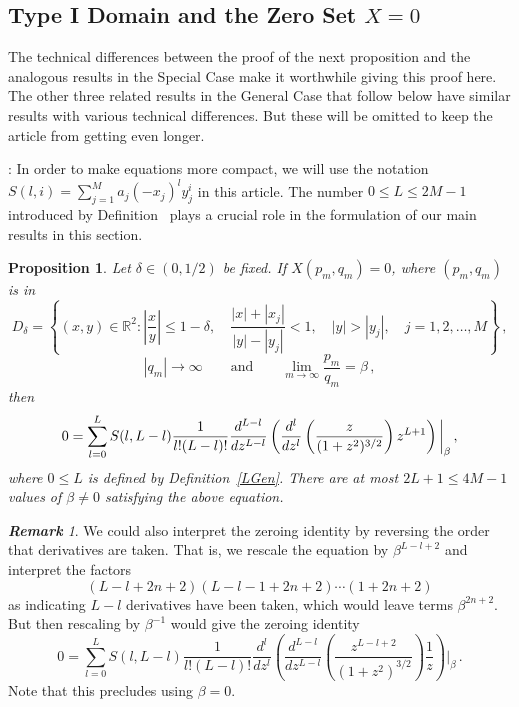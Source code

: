 \documentclass{article}
\newtheorem{prop}[thm]{Proposition}
\theoremstyle{remark}
\newtheorem{rem}[thm]{\bf Remark}
\numberwithin{equation}{section}
\begin{document}
\subsection{Type I Domain and the Zero Set $X=0$}\label{GenXI}

The technical differences between the proof of the next proposition and the analogous results in the Special Case make it worthwhile giving this proof here. 
The other three related results in the General Case that follow below have similar results with various technical differences.  But these will be omitted to 
keep the article from getting even longer.

\medskip

:  In order to make equations more compact, we will use the notation $S(l,i) = \sum_{j=1}^M a_j(-x_j)^ly_j^i$ in this article.
The number $0 \leq L \leq 2M-1$ introduced by Definition~ plays a crucial role in the formulation of our main results in this section. 

\begin{prop}\label{GenXTypeI} Let $\delta \in (0,1/2)$ be fixed. If $X(p_m,q_m) = 0$, where $(p_m,q_m)$ is in
$$ D_{\delta} = \left\{(x,y) \in \mathbb{R}^2: \left| \frac xy \right| \leq 1-\delta, \quad \frac{|x|+|x_j|}{|y|-|y_j|} < 1, \quad |y| > |y_j|, \quad j=1,2,\ldots,M \right\}\,,$$
$$|q_m| \rightarrow \infty \qquad \text{and} \qquad \lim_{m \rightarrow \infty}{\frac{p_m}{q_m}} = \beta\,,$$
then
\begin{equation} \notag
0 = \sum_{l=0}^L S(l,L-l) \frac {1}{l!(L-l)!} \frac{d^{L-l}}{dz^{L-l}} 
\left( \frac {d^l}{dz^l} \left( \frac{z}{(1 +z^2)^{3/2}} \right)z^{L+1} \right)\bigg |_\beta\,, 
\end{equation}
where $0 \leq L$ is defined by Definition~\ref{LGen}.
There are at most $2L+1 \leq 4M-1$ values of $\beta \neq 0$ satisfying the above equation.
\end{prop}

\begin{rem}
We could also interpret the zeroing identity by reversing the order that derivatives are taken. That is, we rescale the equation by $\beta^{L-l+2}$
and interpret the factors 
$$(L-l+2n+2)(L-l-1+2n+2) \cdots (1+2n+2)$$ 
as indicating $L-l$ derivatives have been taken, which would leave terms $\beta^{2n+2}$. But
then rescaling by $\beta^{-1}$ would give the zeroing identity
$$0 = \sum_{l=0}^L S(l,L-l) \frac {1}{l!(L-l)!} \frac {d^{l}}{dz^{l}} 
\left( \frac{d^{L-l}}{dz^{L-l}}\left( \frac{z^{L-l+2}}{(1 +z^2)^{3/2}} \right) \frac {1}{z} \right)\bigg |_\beta\,.$$
Note that this precludes using $\beta = 0$.
\end{rem}
\end{document}
